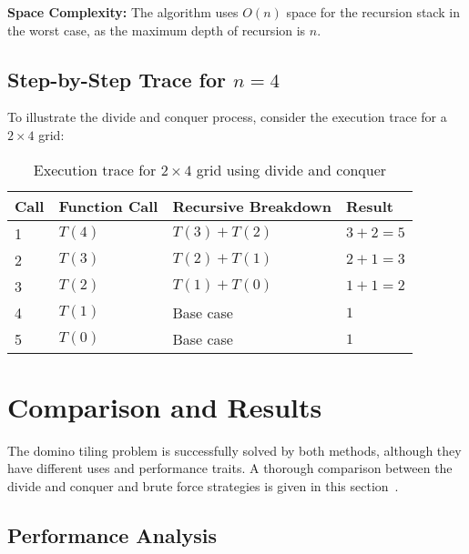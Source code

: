 \documentclass[conference]{IEEEtran}
\begin{document}
\textbf{Space Complexity:} The algorithm uses $O(n)$ space for the recursion stack in the worst case, as the maximum depth of recursion is $n$.

\subsection{Step-by-Step Trace for $n = 4$}

To illustrate the divide and conquer process, consider the execution trace for a $2 \times 4$ grid:

\begin{table}[htbp]
\centering
\caption{Execution trace for $2 \times 4$ grid using divide and conquer}
\label{tab:dc_trace}
\renewcommand{\arraystretch}{2}
\begin{tabular}{|p{1.5cm}|p{2.0cm}|p{2.0cm}|p{1.5cm}|}
\hline
\textbf{Call} & \textbf{Function Call} & \textbf{Recursive Breakdown} & \textbf{Result} \\
\hline
1 & $T(4)$ & $T(3) + T(2)$ & $3 + 2 = 5$ \\
\hline
2 & $T(3)$ & $T(2) + T(1)$ & $2 + 1 = 3$ \\
\hline
3 & $T(2)$ & $T(1) + T(0)$ & $1 + 1 = 2$ \\
\hline
4 & $T(1)$ & Base case & $1$ \\
\hline
5 & $T(0)$ & Base case & $1$ \\
\hline
\end{tabular}
\end{table}

\section{Comparison and Results}

The domino tiling problem is successfully solved by both methods, although they have different uses and performance traits. A thorough comparison between the divide and conquer and brute force strategies is given in this section~\cite{b4, b5}.

\subsection{Performance Analysis}
\end{document}

